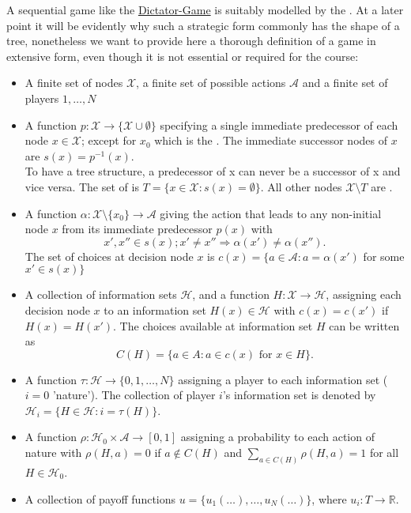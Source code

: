 \begin{definition}
	A sequential game like the \hyperref[Dictator-Game]{Dictator-Game} is suitably modelled by the . At a later point it will be evidently why such a strategic form commonly has the shape of a tree, nonetheless we want to provide here a thorough definition of a game in extensive form, even though it is not essential or required for the course:
\begin{itemize}  
	\item A finite set of nodes $\mathcal{X}$, a finite set of possible actions $\mathcal{A}$ and a finite set of players ${1, \dotsc, N}$
	\item A function $p \colon \mathcal{X} \rightarrow \{ \mathcal{X} \cup \emptyset \}$ specifying a single immediate predecessor of each node $x \in \mathcal{X}$; except for $x_{0}$ which is the . The immediate successor nodes of $x$ are $s(x) = p^{-1}(x)$. \\
		To have a tree structure, a predecessor of x can never be a successor of x and vice versa. The set of  is $T = \{ x \in \mathcal{X}: s(x) = \emptyset \}$. All other nodes $\mathcal{X} \setminus T$ are .
	\item A function $\alpha \colon \mathcal{X} \setminus \{ x_{0} \} \rightarrow \mathcal{A}$ giving the action that leads to any non-initial node $x$ from its immediate predecessor $p(x)$ with
		\[ x', x'' \in s(x); x' \neq x'' \Rightarrow \alpha(x') \neq \alpha(x''). \]
		The set of choices at decision node $x$ is $c(x) = \{ a \in \mathcal{A} : a = \alpha(x')$ for some $x' \in s(x) \}$
	\item A collection of information sets $\mathcal{H}$, and a function $H : \mathcal{X} \rightarrow \mathcal{H}$, assigning each decision node $x$ to an information set $H(x) \in \mathcal{H}$ with $c(x) = c(x')$ if $H(x) = H(x')$.
		The choices available at information set $H$ can be written as
		\[ C(H) = \{a \in A : a \in c(x) \text{ for } x \in H \}. \]
	\item A function $\tau : \mathcal{H} \rightarrow \{0, 1, \dotsc, N \}$ assigning a player to each information set ($i = 0$ 'nature').
		The collection of player $i$'s information set is denoted by $\mathcal{H}_i = \{H \in \mathcal{H} : i = \tau(H) \}$.
	\item A function $\rho : \mathcal{H}_{0} \times \mathcal{A} \rightarrow [0, 1]$ assigning a probability to each action of nature with $ \rho (H,a) = 0$ if $a \notin C(H)$ and $\sum_{a \in C(H)} \rho(H,a) = 1$ for all $H \in \mathcal{H}_{0}$.
	\item A collection of payoff functions $u = \{ u_{1}(\dotsc), \dotsc, u_{N} (\dotsc) \}$, where $u_{i} \colon T \rightarrow \mathds{R}$.
\end{itemize}
\end{definition}

